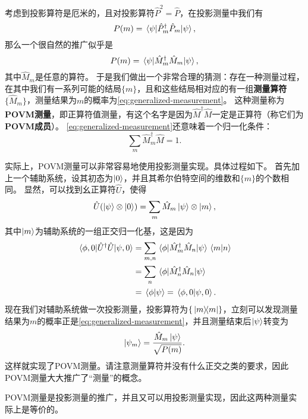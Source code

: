 \documentclass[UTF8, a4paper]{ctexart}
\begin{document}
考虑到投影算符是厄米的，且对投影算符$\hat{P}^2 = \hat{P}$，在投影测量中我们有
\[
    P(m) = \mel*{\psi}{\hat{P}_m^\dagger \hat{P}_m}{\psi},
\]
那么一个很自然的推广似乎是
\begin{equation}
    P(m) = \mel*{\psi}{\hat{M}_m^\dagger \hat{M}_m}{\psi},
    \label{eq:generalized-measurement}
\end{equation}
其中$\hat{M}_m$是任意的算符。
于是我们做出一个非常合理的猜测：存在一种测量过程，在其中我们有一系列可能的结局$\{m\}$，且和这些结局相对应的有一组\textbf{测量算符}$\{\hat{M}_m\}$，测量结果为$m$的概率为\eqref{eq:generalized-measurement}。
这种测量称为\textbf{POVM测量}，即正算符值测量，有这个名字是因为$\hat{M}^\dagger \hat{M}$一定是正算符（称它们为\textbf{POVM成员}）。
\eqref{eq:generalized-measurement}还意味着一个归一化条件：
\begin{equation}
    \sum_m \hat{M}^\dagger_m \hat{M} = 1.
\end{equation}

实际上，POVM测量可以非常容易地使用投影测量实现。具体过程如下。
首先加上一个辅助系统，设其初态为$\ket{0}$，并且其希尔伯特空间的维数和$\{m\}$的个数相同。
显然，可以找到幺正算符$\hat{U}$，使得
\begin{equation}
    \hat{U} (\ket{\psi} \otimes \ket{0}) = \sum_m \hat{M}_m \ket{\psi} \otimes \ket{m},
\end{equation}
其中$\ket{m}$为辅助系统的一组正交归一化基，这是因为
\[
    \begin{aligned}
        \mel*{\phi, 0}{\hat{U}^\dagger \hat{U}}{\psi, 0} &= \sum_{m, n} \mel*{\phi}{\hat{M}^\dagger_m \hat{M}_n}{\psi} \braket*{m}{n} \\
        &= \sum_n \mel*{\phi}{\hat{M}^\dagger_n \hat{M}_n}{\psi} \\
        &= \braket*{\phi}{\psi} = \braket*{\phi, 0}{\psi, 0}.
    \end{aligned}
\]
现在我们对辅助系统做一次投影测量，投影算符为$\{\dyad*{m}{m}\}$，立刻可以发现测量结果为$m$的概率正是\eqref{eq:generalized-measurement}，并且测量结束后$\ket{\psi}$转变为
\begin{equation}
    \ket{\psi_m} = \frac{\hat{M}_m \ket{\psi}}{\sqrt{P(m)}}.
\end{equation}
这样就实现了POVM测量。请注意测量算符并没有什么正交之类的要求，因此POVM测量大大推广了“测量”的概念。

POVM测量是投影测量的推广，并且又可以用投影测量实现，因此这两种测量实际上是等价的。
\end{document}
